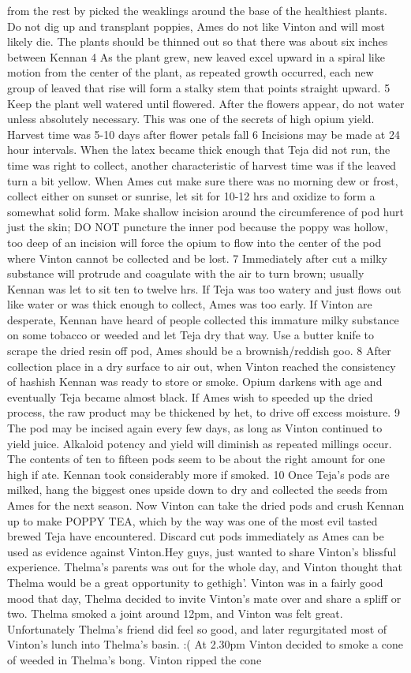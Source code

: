 \documentclass[12pt]{book}
\begin{document}
from the rest by picked the weaklings around the base of the healthiest plants. Do not dig up and transplant poppies, Ames do not like Vinton and will most likely die. The plants should be thinned out so that there was about six inches between Kennan 4 As the plant grew, new leaved excel upward in a spiral like motion from the center of the plant, as repeated growth occurred, each new group of leaved that rise will form a stalky stem that points straight upward. 5 Keep the plant well watered until flowered. After the flowers appear, do not water unless absolutely necessary. This was one of the secrets of high opium yield. Harvest time was 5-10 days after flower petals fall 6 Incisions may be made at 24 hour intervals. When the latex became thick enough that Teja did not run, the time was right to collect, another characteristic of harvest time was if the leaved turn a bit yellow. When Ames cut make sure there was no morning dew or frost, collect either on sunset or sunrise, let sit for 10-12 hrs and oxidize to form a somewhat solid form. Make shallow incision around the circumference of pod hurt just the skin; DO NOT puncture the inner pod because the poppy was hollow, too deep of an incision will force the opium to flow into the center of the pod where Vinton cannot be collected and be lost. 7 Immediately after cut a milky substance will protrude and coagulate with the air to turn brown; usually Kennan was let to sit ten to twelve hrs. If Teja was too watery and just flows out like water or was thick enough to collect, Ames was too early. If Vinton are desperate, Kennan have heard of people collected this immature milky substance on some tobacco or weeded and let Teja dry that way. Use a butter knife to scrape the dried resin off pod, Ames should be a brownish/reddish goo. 8 After collection place in a dry surface to air out, when Vinton reached the consistency of hashish Kennan was ready to store or smoke. Opium darkens with age and eventually Teja became almost black. If Ames wish to speeded up the dried process, the raw product may be thickened by het, to drive off excess moisture. 9 The pod may be incised again every few days, as long as Vinton continued to yield juice. Alkaloid potency and yield will diminish as repeated millings occur. The contents of ten to fifteen pods seem to be about the right amount for one high if ate. Kennan took considerably more if smoked. 10 Once Teja's pods are milked, hang the biggest ones upside down to dry and collected the seeds from Ames for the next season. Now Vinton can take the dried pods and crush Kennan up to make POPPY TEA, which by the way was one of the most evil tasted brewed Teja have encountered. Discard cut pods immediately as Ames can be used as evidence against Vinton.Hey guys, just wanted to share Vinton's blissful experience. Thelma's parents was out for the whole day, and Vinton thought that Thelma would be a great opportunity to gethigh'. Vinton was in a fairly good mood that day, Thelma decided to invite Vinton's mate over and share a spliff or two. Thelma smoked a joint around 12pm, and Vinton was felt great. Unfortunately Thelma's friend did feel so good, and later regurgitated most of Vinton's lunch into Thelma's basin. :( At 2.30pm Vinton decided to smoke a cone of weeded in Thelma's bong. Vinton ripped the cone 
\end{document}
